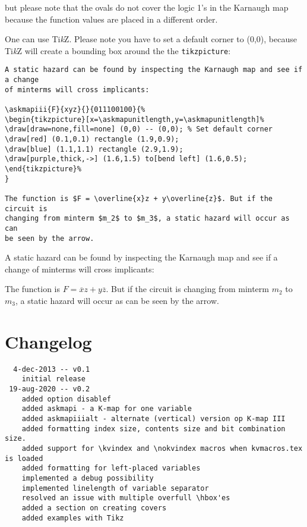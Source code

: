 \documentclass[a4paper,10pt]{ltxdoc}
\begin{document}
\bigskip
but please note that the ovals do not cover the logic 1's in the Karnaugh map
because the function values are placed in a different order.

One can use Ti\textsl{k}Z. Please note you have to set a default corner to
(0,0), because Ti\textsl{k}Z will create a bounding box around the the
\texttt{tikzpicture}:

\begin{verbatim}
A static hazard can be found by inspecting the Karnaugh map and see if a change
of minterms will cross implicants:

\askmapiii{F}{xyz}{}{011100100}{%
\begin{tikzpicture}[x=\askmapunitlength,y=\askmapunitlength]%
\draw[draw=none,fill=none] (0,0) -- (0,0); % Set default corner
\draw[red] (0.1,0.1) rectangle (1.9,0.9);
\draw[blue] (1.1,1.1) rectangle (2.9,1.9);
\draw[purple,thick,->] (1.6,1.5) to[bend left] (1.6,0.5);
\end{tikzpicture}%
}

The function is $F = \overline{x}z + y\overline{z}$. But if the circuit is
changing from minterm $m_2$ to $m_3$, a static hazard will occur as can
be seen by the arrow.
\end{verbatim}


A static hazard can be found by inspecting the Karnaugh map and see if a change
of minterms will cross implicants:


The function is $F = \overline{x}z + y\overline{z}$. But if the circuit is
changing from minterm $m_2$ to $m_3$, a static hazard will occur as can
be seen by the arrow.



\section{Changelog}
\label{sec:changelog}
\begin{verbatim}
  4-dec-2013 -- v0.1
    initial release
 19-aug-2020 -- v0.2
    added option disablef
    added askmapi - a K-map for one variable
    added askmapiiialt - alternate (vertical) version op K-map III
    added formatting index size, contents size and bit combination size.
    added support for \kvindex and \nokvindex macros when kvmacros.tex is loaded
    added formatting for left-placed variables
    implemented a debug possibility
    implemented linelength of variable separator
    resolved an issue with multiple overfull \hbox'es
    added a section on creating covers
    added examples with Tikz
\end{verbatim}
\end{document}
